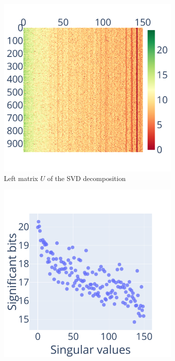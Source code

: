\documentclass[10pt,journal,compsoc]{IEEEtran}
\begin{document}
\begin{figure}
    \centering
    \begin{subfigure}{0.3\linewidth}
        \includegraphics[width=\linewidth]{figure/face_recognition/randomized_svd_ret_U_sig.pdf}
        \caption{Left matrix $U$ of the SVD decomposition}
        \label{fig:randomized_svd_U}
    \end{subfigure}
    \begin{subfigure}{0.3\linewidth}
        \includegraphics[width=\linewidth]{figure/face_recognition/svd_ret_S_sig.pdf}

\end{subfigure}
\end{figure}
\end{document}
